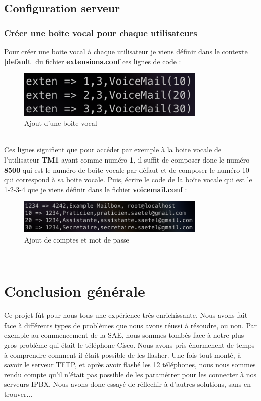 \documentclass[12pt, a4paper]{article}
\begin{document}
	\subsection{Configuration serveur}
		\subsubsection{Créer une boîte vocal pour chaque utilisateurs}
		Pour créer une boite vocal à chaque utilisateur je viens définir 
		dans le contexte \textbf{[default]} du fichier \textbf{extensions.conf}
		ces lignes de code : 
		\begin{figure}[h]
			\centering
			\includegraphics[width=0.8\textwidth]{img/cont.png}
			\caption{Ajout d'une boite vocal}
			\label{fig:cont}
		\end{figure}\\
		Ces lignes signifient que pour accéder par exemple à la boite vocale
		de l'utilisateur \textbf{TM1} ayant comme numéro \textbf{1}, il suffit
		de composer donc le numéro \textbf{8500} qui est le numéro de boîte vocale
		par défaut et de composer le numéro 10 qui correspond à sa boite vocale. 
		Puis, écrire le code de la boîte vocale qui est le 1-2-3-4 que je viens
		définir dans le fichier \textbf{voicemail.conf} :\\
		\begin{figure}[h]
			\centering
			\includegraphics[width=0.8\textwidth]{img/voic.png}
			\caption{Ajout de comptes et mot de passe}
			\label{fig:voic}
		\end{figure}\\

\newpage
\section{Conclusion générale}
Ce projet fût pour nous tous une expérience très enrichissante. Nous avons
fait face à différents types de problèmes que nous avons réussi à résoudre, 
ou non. Par exemple au commencement de la SAE, nous sommes tombés face à 
notre plus gros problème qui était le téléphone Cisco. Nous avons pris énormenent
de temps à comprendre comment il était possible de les flasher. Une fois 
tout monté, à savoir le serveur TFTP, et après avoir flashé les 12 téléphones, 
nous nous sommes rendu compte qu'il n'était pas possible de les paramétrer 
pour les connecter à nos serveurs IPBX. Nous avons donc essayé de réflechir
à d'autres solutions, sans en trouver...\\
\end{document}
